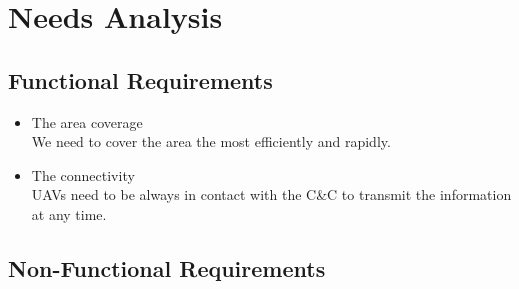 \chapter{Needs Analysis}

\section{Functional Requirements}

\begin{itemize}

\item The area coverage\\
We need to cover the area the most efficiently and rapidly.

\item The connectivity\\
UAVs need to be always in contact with the C\&C to transmit the information at any time.

\end{itemize}

\section{Non-Functional Requirements}
